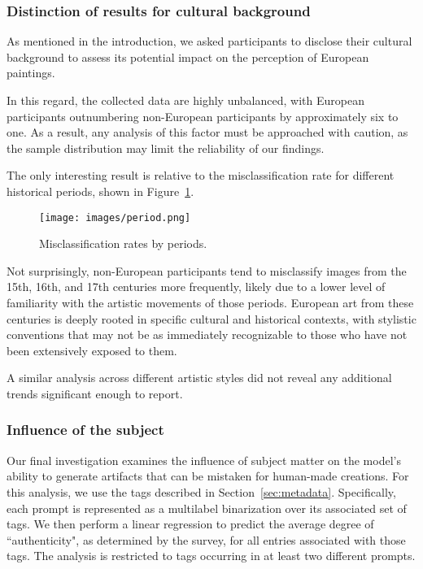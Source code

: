 \documentclass[sn-mathphys]{sn-jnl}
\begin{document}
\subsubsection{Distinction of results for cultural background}
As mentioned in the introduction, we asked participants to disclose their cultural background to assess its potential impact on the perception of European paintings.

In this regard, the collected data are highly unbalanced, with European participants outnumbering non-European participants by approximately six to one. As a result, any analysis of this factor must be approached with caution, as the sample distribution may limit the reliability of our findings.

The only interesting result is relative to 
the misclassification rate for different historical
periods, shown in Figure~\ref{fig:barplotperiods}.


\begin{figure}[h] %
    \centering
    \texttt{[image: images/period.png]} %
    \caption{Misclassification rates by periods.}
    \label{fig:barplotperiods} %
\end{figure}

Not surprisingly, non-European participants tend to misclassify images from the 15th, 16th, and 17th centuries more frequently, likely due to a lower level of familiarity with the artistic movements of those periods. European art from these centuries is deeply rooted in specific cultural and historical contexts, with stylistic conventions that may not be as immediately recognizable to those who have not been extensively exposed to them. 

A similar analysis across different artistic styles did not reveal any additional trends significant enough to report. 

\subsubsection{Influence of the subject}
\label{sec:subject_influence}
Our final investigation examines the influence of subject matter on the model's ability to generate artifacts that can be mistaken for human-made creations. For this analysis, we use the tags described in Section~\ref{sec:metadata}. Specifically, each prompt is represented as a multilabel binarization over its associated set of tags. We then perform a linear regression to predict the average degree of ``authenticity", as determined by the survey, for all entries associated with those tags. The analysis is restricted to tags occurring in at least two different prompts.
\end{document}
